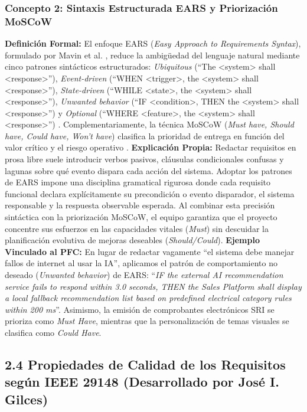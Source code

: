\documentclass[conference,10pt]{IEEEtran}
\begin{document}
	\subsubsection{Concepto 2: Sintaxis Estructurada EARS y Priorización MoSCoW}
	\textbf{Definición Formal:} El enfoque EARS (\textit{Easy Approach to Requirements Syntax}), formulado por Mavin et al. \cite{mavin2009ears}, reduce la ambigüedad del lenguaje natural mediante cinco patrones sintácticos estructurados: \textit{Ubiquitous} (``The <system> shall <response>''), \textit{Event-driven} (``WHEN <trigger>, the <system> shall <response>''), \textit{State-driven} (``WHILE <state>, the <system> shall <response>''), \textit{Unwanted behavior} (``IF <condition>, THEN the <system> shall <response>'') y \textit{Optional} (``WHERE <feature>, the <system> shall <response>'') \cite{mavin2009ears}. Complementariamente, la técnica MoSCoW (\textit{Must have, Should have, Could have, Won't have}) clasifica la prioridad de entrega en función del valor crítico y el riesgo operativo \cite{ireb2023, wiegers2013}.
	\textbf{Explicación Propia:} Redactar requisitos en prosa libre suele introducir verbos pasivos, cláusulas condicionales confusas y lagunas sobre qué evento dispara cada acción del sistema. Adoptar los patrones de EARS impone una disciplina gramatical rigurosa donde cada requisito funcional declara explícitamente su precondición o evento disparador, el sistema responsable y la respuesta observable esperada. Al combinar esta precisión sintáctica con la priorización MoSCoW, el equipo garantiza que el proyecto concentre sus esfuerzos en las capacidades vitales (\textit{Must}) sin descuidar la planificación evolutiva de mejoras deseables (\textit{Should/Could}).
	\textbf{Ejemplo Vinculado al PFC:} En lugar de redactar vagamente ``el sistema debe manejar fallos de internet al usar la IA'', aplicamos el patrón de comportamiento no deseado (\textit{Unwanted behavior}) de EARS: ``\textit{IF the external AI recommendation service fails to respond within 3.0 seconds, THEN the Sales Platform shall display a local fallback recommendation list based on predefined electrical category rules within 200 ms}''. Asimismo, la emisión de comprobantes electrónicos SRI se prioriza como \textit{Must Have}, mientras que la personalización de temas visuales se clasifica como \textit{Could Have}.
	\subsection{2.4 Propiedades de Calidad de los Requisitos según IEEE 29148 (Desarrollado por José I. Gilces)}
\end{document}
